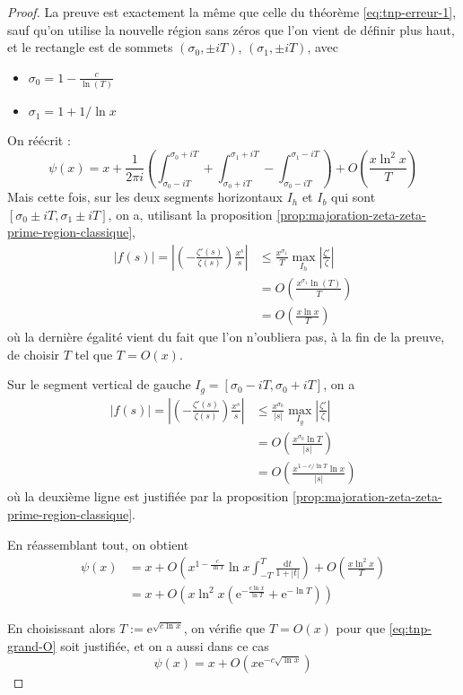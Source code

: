 \documentclass[french]{report}
\begin{document}
\begin{proof}
  La preuve est exactement la même que celle du théorème \ref{eq:tnp-erreur-1}, sauf qu'on utilise la nouvelle région sans zéros que l'on vient de définir plus haut, et le rectangle est de sommets $(\sigma_0,\pm iT)$, $(\sigma_1,\pm iT)$, avec 
  \begin{itemize}
    \item $\sigma_0=1-\frac{c}{\ln(T)}$
    \item $\sigma_1=1+1/\ln x$
  \end{itemize}
  On réécrit :
  \begin{equation}\label{eq:tnp-3-integrales}
    \psi(x) = x +\frac{1}{2\pi i}\left(
      \int_{\sigma_0-iT}^{\sigma_0+iT}
      +\int_{\sigma_0+iT}^{\sigma_1+iT}
      -\int_{\sigma_0-iT}^{\sigma_1-iT}
    \right)
    +O\left(\frac{x\ln^2x}{T}\right)
  \end{equation}
  Mais cette fois, sur les deux segments horizontaux $I_h$ et $I_b$ qui sont $[\sigma_0\pm iT,\sigma_1\pm iT]$, on a, utilisant la proposition \ref{prop:majoration-zeta-zeta-prime-region-classique},
  \begin{align}
    |f(s)| = \left|\left(-\frac{\zeta'(s)}{\zeta(s)}\right)\frac{x^s}{s}\right| & \leq\frac{x^{\sigma_1}}{T}\max_{I_h}\left|\frac{\zeta'}{\zeta}\right| \\
    & = O\left(\frac{x^{\sigma_1}\ln(T)}{T}\right) \\
    & = O\left(\frac{x\ln x}{T}\right) \label{eq:tnp-grand-O}
  \end{align}
  où la dernière égalité vient du fait que l'on n'oubliera pas, à la fin de la preuve, de choisir $T$ tel que $T=O(x)$.

  Sur le segment vertical de gauche $I_g=[\sigma_0-iT, \sigma_0+iT]$, on a
  \begin{align*}
    |f(s)| = \left|\left(-\frac{\zeta'(s)}{\zeta(s)}\right)\frac{x^s}{s}\right| & \leq\frac{x^{\sigma_0}}{|s|}\max_{I_g}\left|\frac{\zeta'}{\zeta}\right| \\
    & = O\left(\frac{x^{\sigma_0}\ln T}{|s|}\right) \\
    & = O\left(\frac{x^{1-c/\ln T}\ln x}{|s|}\right)
  \end{align*}
  où la deuxième ligne est justifiée par la proposition \ref{prop:majoration-zeta-zeta-prime-region-classique}.

  En réassemblant tout, on obtient
  \begin{align*}
    \psi(x) &= x + O\left(x^{1-\frac{c}{\ln T}}\ln x\int_{-T}^T\frac{\mathrm{d}t}{1+|t|}\right) + O\left(\frac{x\ln^2x}{T}\right) \\
    &= x + O\left(x\ln^2 x\left(\mathrm{e}^{-\frac{c\ln x}{\ln T}}+\mathrm{e}^{-\ln T}\right)\right)
  \end{align*}

  En choisissant alors $T:=\mathrm{e}^{\sqrt{c\ln x}}$, on vérifie que $T=O(x)$ pour que \ref{eq:tnp-grand-O} soit justifiée, et on a aussi dans ce cas
  \[ \psi(x)=x+O(x\mathrm{e}^{-c\sqrt{\ln x}}) \]
\end{proof}
\end{document}
